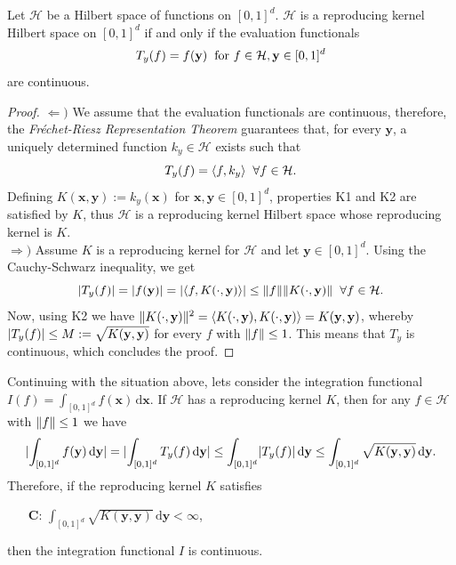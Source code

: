 \begin{Th}
    Let $\mathcal{H}$ be a Hilbert space of functions on $[0,1]^d$. $\mathcal{H}$ is a reproducing kernel Hilbert space on $[0,1]^d$ if and only if the evaluation functionals $$ T_y(f) = f(\textbf{y}) \hspace{2mm} \text{for } f \in \mathcal{H}, \textbf{y} \in [0,1]^d $$ are continuous.
\end{Th}
\begin{proof} $\Leftarrow)$ We assume that the evaluation functionals are continuous, therefore, the \textit{Fréchet-Riesz Representation Theorem} guarantees that, for every $\textbf{y}$, a uniquely determined function $k_y \in \mathcal{H}$ exists such that $$ T_y(f) = \langle f,k_y \rangle \hspace{2mm} \forall f \in \mathcal{H}.$$ Defining $K(\textbf{x},\textbf{y}) := k_y(\textbf{x})$ for $\textbf{x},\textbf{y} \in [0,1]^d$, properties K1 and K2 are satisfied by $K$, thus $\mathcal{H}$ is a reproducing kernel Hilbert space whose reproducing kernel is $K$.\\ 

$\Rightarrow)$ Assume $K$ is a reproducing kernel for $\mathcal{H}$ and let $\textbf{y} \in [0,1]^d$. Using the Cauchy-Schwarz inequality, we get $$ \lvert T_y(f)\rvert = \lvert f(\textbf{y})\rvert = \lvert\langle f,K(\cdot,\textbf{y}) \rangle\rvert \leq \lVert f\rVert \lVert K(\cdot,\textbf{y})\rVert \hspace{2mm} \forall f \in \mathcal{H}.$$
Now, using K2 we have $\lVert K(\cdot,\textbf{y})\rVert^2 = \langle K(\cdot,\textbf{y}),K(\cdot,\textbf{y}) \rangle = K(\textbf{y},\textbf{y})$, whereby $\lvert T_y(f)\rvert\leq M := \sqrt{K(\textbf{y},\textbf{y})}$ for every $f$ with $\lVert f\rVert\leq 1$. This means that $T_y$ is continuous, which concludes the proof. %
\end{proof}

\vspace{2mm}
Continuing with the situation above, lets consider the integration functional $I(f) = \int_{[0,1]^d} f(\textbf{x})\,\mathrm{d}\textbf{x}$. If $\mathcal{H}$ has a reproducing kernel $K$, then for any $f \in \mathcal{H}$ with $\lVert f\rVert\leq 1$ we have
\begin{equation*}
    \lvert\int_{[0,1]^d} f(\textbf{y}) \,\mathrm{d}\textbf{y}\rvert = \lvert\int_{[0,1]^d} T_y(f) \,\mathrm{d}\textbf{y}\rvert \leq \int_{[0,1]^d} \lvert T_y(f)\rvert \,\mathrm{d}\textbf{y} \leq \int_{[0,1]^d} \sqrt{K(\textbf{y},\textbf{y})} \,\mathrm{d}\textbf{y}.
\end{equation*}
Therefore, if the reproducing kernel $K$ satisfies
\begin{itemize}
    \item[$\textbf{C}$:] $\int_{[0,1]^d} \sqrt{K(\textbf{y},\textbf{y})} \,\mathrm{d}\textbf{y} < \infty$,
\end{itemize}
then the integration functional $I$ is continuous.\\

